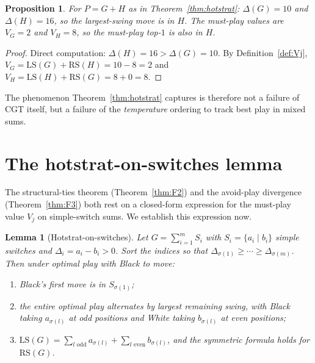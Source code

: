 \documentclass[11pt,a4paper]{amsart}
\newtheorem{proposition}[theorem]{Proposition}
\newtheorem{lemma}[theorem]{Lemma}
\theoremstyle{definition}
\theoremstyle{remark}
\newcommand{\LS}{\mathrm{LS}}
\newcommand{\RS}{\mathrm{RS}}
\begin{document}
\begin{proposition}\label{prop:CDright}
For $P = G + H$ as in Theorem~\ref{thm:hotstrat}:
$\Delta(G) = 10$ and $\Delta(H) = 16$, so the largest-swing move is in
$H$. The must-play values are $V_G = 2$ and $V_H = 8$, so the must-play
top-$1$ is also in $H$.
\end{proposition}

\begin{proof}
Direct computation: $\Delta(H) = 16 > \Delta(G) = 10$. By
Definition~\ref{def:Vj},
$V_G = \LS(G) + \RS(H) = 10 - 8 = 2$ and
$V_H = \LS(H) + \RS(G) = 8 + 0 = 8$.
\end{proof}

The phenomenon Theorem~\ref{thm:hotstrat} captures is therefore not a
failure of CGT itself, but a failure of the \emph{temperature} ordering
to track best play in mixed sums.

\section{The hotstrat-on-switches lemma}\label{sec:H}

The structural-ties theorem (Theorem~\ref{thm:F2}) and the avoid-play
divergence (Theorem~\ref{thm:F3}) both rest on a closed-form expression
for the must-play value $V_j$ on simple-switch sums. We establish this
expression now.

\begin{lemma}[Hotstrat-on-switches]\label{lem:H}
Let $G = \sum_{i=1}^m S_i$ with $S_i = \{a_i \mid b_i\}$ simple switches
and $\Delta_i = a_i - b_i > 0$. Sort the indices so that
$\Delta_{\sigma(1)} \geq \cdots \geq \Delta_{\sigma(m)}$. Then under
optimal play with Black to move:
\begin{enumerate}[label=(\alph*)]
\item Black's first move is in $S_{\sigma(1)}$;
\item the entire optimal play alternates by largest remaining swing,
  with Black taking $a_{\sigma(l)}$ at odd positions and White taking
  $b_{\sigma(l)}$ at even positions;
\item $\LS(G) = \sum_{l \text{ odd}} a_{\sigma(l)} +
  \sum_{l \text{ even}} b_{\sigma(l)}$, and the symmetric formula holds
  for $\RS(G)$.
\end{enumerate}
\end{lemma}
\end{document}

